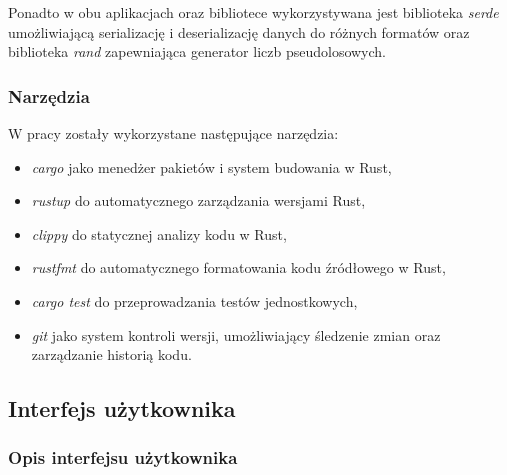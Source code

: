            Ponadto w obu aplikacjach oraz bibliotece wykorzystywana jest biblioteka \textit{serde}\cite{Rust:serde} umożliwiającą serializację i deserializację danych do różnych formatów oraz biblioteka \textit{rand}\cite{Rust:rand} zapewniająca generator liczb pseudolosowych.

        \subsubsection{Narzędzia}
            
            W pracy zostały wykorzystane następujące narzędzia:
            \begin{itemize}
                \item \textit{cargo} jako menedżer pakietów i system budowania w Rust,
                \item \textit{rustup} do automatycznego zarządzania wersjami Rust,
                \item \textit{clippy} do statycznej analizy kodu w Rust,
                \item \textit{rustfmt} do automatycznego formatowania kodu źródłowego w Rust,
                \item \textit{cargo test} do przeprowadzania testów jednostkowych,
                \item \textit{git} jako system kontroli wersji, umożliwiający śledzenie zmian oraz zarządzanie historią kodu.
            \end{itemize}

    \subsection{Interfejs użytkownika}

        \subsubsection{Opis interfejsu użytkownika}


